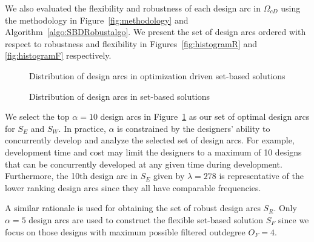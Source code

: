 We also evaluated the flexibility and robustness of each design arc in $\Omega_{cD}$ using the methodology in Figure~\ref{fig:methodology} and Algorithm~\ref{algo:SBDRobustalgo}. We present the set of design arcs ordered with respect to robustness and flexibility in Figures~\ref{fig:histogramR} and \ref{fig:histogramF} respectively.

\begin{figure}[h!]
	\centering
	 \hspace{0.1\textwidth}%
	 \hspace{0.1\textwidth}%
	\caption{Distribution of design arcs in optimization driven set-based solutions}
	\label{fig:histogramplotsSBD}
\end{figure}

\begin{figure}[h!]
	\centering
	 \hspace{0.1\textwidth}%
	 \hspace{0.1\textwidth}%
	\caption{Distribution of design arcs in set-based solutions}
	\label{fig:histogramplots}
\end{figure}

We select the top $\alpha = 10$ design arcs in Figure~\ref{fig:histogramplotsSBD} as our set of optimal design arcs for $S_E$ and $S_W$. In practice, $\alpha$ is constrained by the designers' ability to concurrently develop and analyze the selected set of design arcs. For example, development time and cost may limit the designers to a maximum of 10 designs that can be concurrently developed at any given time during development. Furthermore, the 10th design arc in $S_E$ given by $\lambda = 278$ is representative of the lower ranking design arcs since they all have comparable frequencies. 

A similar rationale is used for obtaining the set of robust design arcs $S_R$. Only $\alpha=5$ design arcs are used to construct the flexible set-based solution $S_F$ since we focus on those designs with maximum possible filtered outdegree $O_F = 4$.

